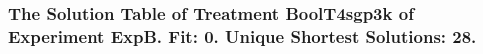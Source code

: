  \begin{frame}
 \fontsize{8pt}{9pt}\selectfont
 \frametitle{ The Solution Table of Treatment BoolT4sgp3k of Experiment ExpB. Fit: 0. Unique Shortest Solutions: 28. }

 \label{ExpBSolutionTable021.tex}  
 \end{frame}

